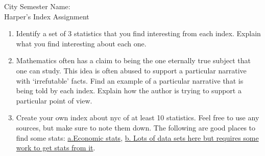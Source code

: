 \documentclass[12pt]{article}
\theoremstyle{plain}     %
\begin{document}
\large
City Semester  \hspace{8cm} Name:\makebox[6cm]{\hrulefill}
\\
Harper's Index Assignment\\
\normalsize 
\begin{enumerate}
	\item Identify a set of 3 statistics that you find interesting from each index. Explain what you find interesting about each one.
	\item Mathematics often has a claim to being the one eternally true subject that one can study. This idea is often abused to support a particular narrative with `irrefutable' facts. Find an example of a particular narrative that is being told by each index. Explain how the author is trying to support a particular point of view.
	\item Create your own index about nyc of at least 10 statistics. Feel free to use any sources, but make sure to note them down. The following are good places to find some stats: \href{http://www.nycedc.com/resources/economic-research-analysis/economic-snapshots}{a.Economic stats}, \href{https://data.cityofnewyork.us/}{b. Lots of data sets here but requires some work to get stats from it}.
\end{enumerate}
	
\end{document}

